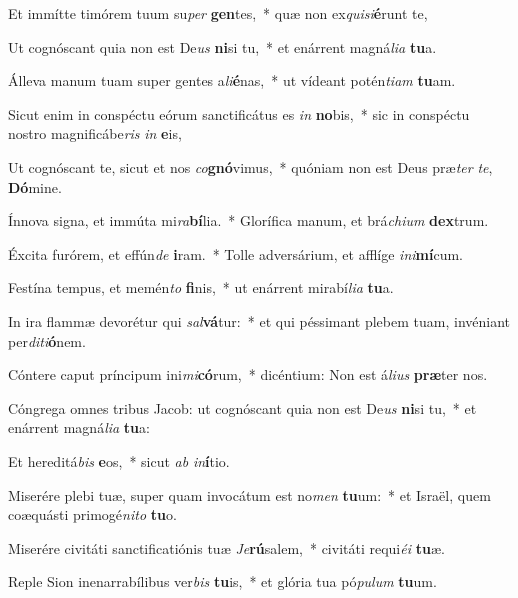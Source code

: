 \item Et immítte timórem tuum su\textit{per} \textbf{gen}tes,~* quæ non ex\textit{qui}\textit{si}\textbf{é}runt te,
\item Ut cognóscant quia non est De\textit{us} \textbf{ni}si tu,~* et enárrent magná\textit{li}\textit{a} \textbf{tu}a.
\item Álleva manum tuam super gentes a\textit{li}\textbf{é}nas,~* ut vídeant potén\textit{ti}\textit{am} \textbf{tu}am.
\item Sicut enim in conspéctu eórum sanctificátus es \textit{in} \textbf{no}bis,~* sic in conspéctu nostro magnificábe\textit{ris} \textit{in} \textbf{e}is,
\item Ut cognóscant te, sicut et nos \textit{co}\textbf{gnó}vimus,~* quóniam non est Deus præ\textit{ter} \textit{te}, \textbf{Dó}mine.
\item Ínnova signa, et immúta mi\textit{ra}\textbf{bí}lia.~* Glorífica manum, et brá\textit{chi}\textit{um} \textbf{dex}trum.
\item Éxcita furórem, et effún\textit{de} \textbf{i}ram.~* Tolle adversárium, et afflíge \textit{in}\textit{i}\textbf{mí}cum.
\item Festína tempus, et memén\textit{to} \textbf{fi}nis,~* ut enárrent mirabí\textit{li}\textit{a} \textbf{tu}a.
\item In ira flammæ devorétur qui \textit{sal}\textbf{vá}tur:~* et qui péssimant plebem tuam, invéniant per\textit{di}\textit{ti}\textbf{ó}nem.
\item Cóntere caput príncipum ini\textit{mi}\textbf{có}rum,~* dicéntium: Non est á\textit{li}\textit{us} \textbf{præ}ter nos.
\item Cóngrega omnes tribus Jacob: ut cognóscant quia non est De\textit{us} \textbf{ni}si tu,~* et enárrent magná\textit{li}\textit{a} \textbf{tu}a:
\item Et hereditá\textit{bis} \textbf{e}os,~* sicut \textit{ab} \textit{in}\textbf{í}tio.
\item Miserére plebi tuæ, super quam invocátum est no\textit{men} \textbf{tu}um:~* et Israël, quem coæquásti primogé\textit{ni}\textit{to} \textbf{tu}o.
\item Miserére civitáti sanctificatiónis tuæ \textit{Je}\textbf{rú}salem,~* civitáti requi\textit{é}\textit{i} \textbf{tu}æ.
\item Reple Sion inenarrabílibus ver\textit{bis} \textbf{tu}is,~* et glória tua pó\textit{pu}\textit{lum} \textbf{tu}um.
